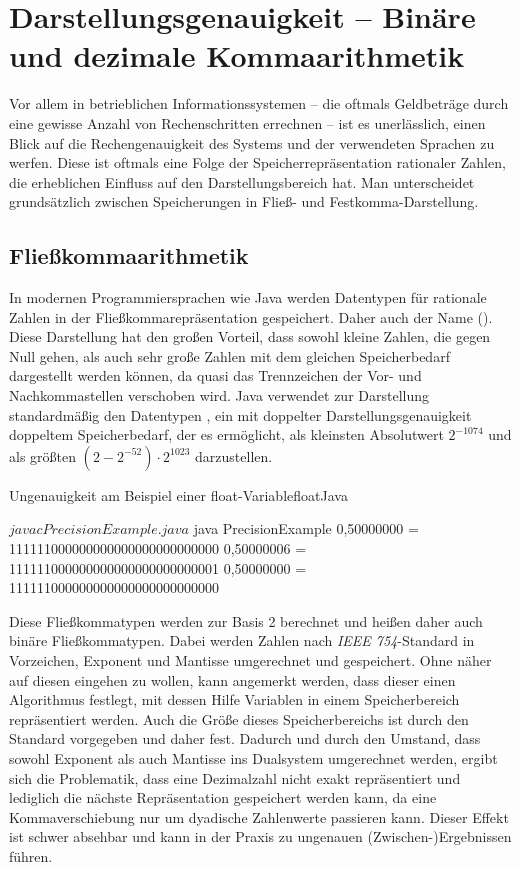 \section{Darstellungsgenauigkeit -- Binäre und dezimale Kommaarithmetik}
Vor allem in betrieblichen Informationssystemen -- die oftmals Geldbeträge durch eine gewisse Anzahl von Rechenschritten errechnen -- ist es unerlässlich, einen Blick auf die Rechengenauigkeit des Systems und der verwendeten Sprachen zu werfen. Diese ist oftmals eine Folge der Speicherrepräsentation rationaler Zahlen, die erheblichen Einfluss auf den Darstellungsbereich hat. Man unterscheidet grundsätzlich zwischen Speicherungen in Fließ- und Festkomma-Darstellung.
 
\subsection*{Fließkommaarithmetik}
In modernen Programmiersprachen wie Java werden Datentypen für rationale Zahlen in der Fließkommarepräsentation gespeichert. Daher auch der Name  (\engl {}). Diese Darstellung hat den großen Vorteil, dass sowohl kleine Zahlen, die gegen Null gehen, als auch sehr große Zahlen mit dem gleichen Speicherbedarf dargestellt werden können, da quasi das Trennzeichen der Vor- und Nachkommastellen verschoben wird. Java verwendet zur Darstellung standardmäßig den Datentypen , ein  mit doppelter Darstellungsgenauigkeit \bzw doppeltem Speicherbedarf, der es ermöglicht, als kleinsten Absolutwert $2^{-1074}$ und als größten $(2 - 2^{-52}) \cdot 2^{1023}$ darzustellen.

\begin{codeWithCaption}{Ungenauigkeit am Beispiel einer float-Variable}{floatJava}
    \begin{shellwindow}
    $ javac PrecisionExample.java 
    $ java PrecisionExample
    0,50000000 = 111111000000000000000000000000
    0,50000006 = 111111000000000000000000000001
    0,50000000 = 111111000000000000000000000000
    \end{shellwindow}
\end{codeWithCaption}

Diese Fließkommatypen werden zur Basis 2 berechnet und heißen daher auch binäre Fließkommatypen. Dabei werden Zahlen nach \textit{IEEE 754}-Standard in Vorzeichen, Exponent und Mantisse umgerechnet und gespeichert. Ohne näher auf diesen eingehen zu wollen, kann angemerkt werden, dass dieser einen Algorithmus festlegt, mit dessen Hilfe Variablen in einem Speicherbereich repräsentiert werden. Auch die Größe dieses Speicherbereichs ist durch den Standard vorgegeben und daher fest. Dadurch und durch den Umstand, dass sowohl Exponent als auch Mantisse ins Dualsystem umgerechnet werden, ergibt sich die Problematik, dass eine Dezimalzahl \uU nicht exakt repräsentiert und lediglich die nächste Repräsentation gespeichert werden kann, da eine Kommaverschiebung nur um dyadische Zahlenwerte passieren kann. Dieser Effekt ist schwer absehbar und kann in der Praxis zu ungenauen (Zwischen-)Ergebnissen führen.

